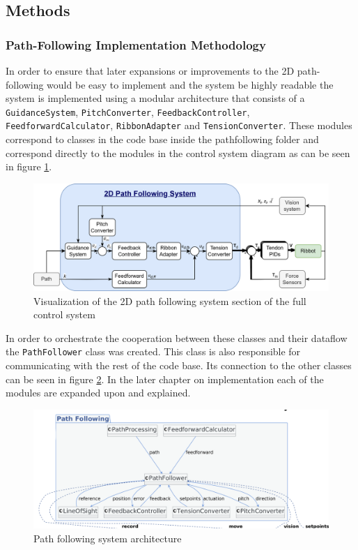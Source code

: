 \subsection{Methods}

\subsubsection{Path-Following Implementation Methodology}
In order to ensure that later expansions or improvements to the 2D path-following would be easy to implement and the system be highly readable the  system is implemented using a modular architecture that consists of a \texttt{GuidanceSystem}, \texttt{PitchConverter}, \texttt{FeedbackController}, \texttt{FeedforwardCalculator}, \texttt{RibbonAdapter} and \texttt{TensionConverter}. These modules correspond to classes in the code base inside the pathfollowing folder and correspond directly to the modules in the control system diagram as can be seen in figure \ref{fig:2DpathfollowingSystemControlDiag}. 

\begin{figure} [H]
    \centering
    \includegraphics[width=\linewidth]{images/RibbotControl_2Dpathfollowing400p.png}
    \caption{Visualization of the 2D path following system section of the full control system}
    \label{fig:2DpathfollowingSystemControlDiag}
\end{figure}

In order to orchestrate the cooperation between these classes and their dataflow the \texttt{PathFollower} class was created. This class is also responsible for communicating with the rest of the code base. Its connection to the other classes can be seen in figure \ref{fig:pathfolloingmodules}.   In the later chapter on implementation each of the modules are expanded upon and explained.

\begin{figure}[H]
    \centering
    \includegraphics[width=\linewidth]{images/Software documentation/pathfollowingmodules.png}
    \caption{Path following system architecture}
    \label{fig:pathfolloingmodules}
\end{figure}

